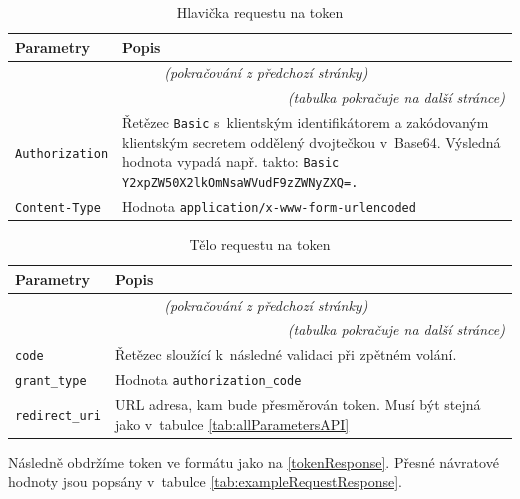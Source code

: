 \documentclass[czech, bc, kiv, he, iso690numb]{fasthesis}
\begin{document}
	\begin{longtable}{p{}p{}}
	\caption{Hlavička requestu na token \cite{emplifiDocs}}
	\label{tab:exampleRequestHeader}\\
	\toprule[1.5pt]
	\textbf{Parametry} & \textbf{Popis}\\
	\midrule
	\endfirsthead
	\multicolumn{2}{c}{\tablename{}~\thetable{} \textit{(pokračování z předchozí stránky)}}\\
	\endhead
	\midrule
	\multicolumn{2}{r}{\textit{(tabulka pokračuje na další stránce)}}\\
	\endfoot
	\bottomrule[1.5pt]
	\endlastfoot
	\verb"Authorization" & Řetězec \texttt{Basic} s~klientským identifikátorem a zakódovaným klientským secretem oddělený dvojtečkou v~Base64. Výsledná hodnota vypadá např. takto: \texttt{Basic Y2xpZW50X2lkOmNsaWVudF9zZWNyZXQ=.}\\
	\midrule
	\verb"Content-Type" & Hodnota \texttt{application/x-www-form-urlencoded} \\
	\end{longtable}

	\begin{longtable}{p{}p{}}
	\caption{Tělo requestu na token \cite{emplifiDocs}}
	\label{tab:exampleRequestBody}\\
	\toprule[1.5pt]
	\textbf{Parametry} & \textbf{Popis}\\
	\midrule
	\endfirsthead
	\multicolumn{2}{c}{\tablename{}~\thetable{} \textit{(pokračování z předchozí stránky)}}\\
	\endhead
	\midrule
	\multicolumn{2}{r}{\textit{(tabulka pokračuje na další stránce)}}\\
	\endfoot
	\bottomrule[1.5pt]
	\endlastfoot
	\verb"code" & Řetězec sloužící k~následné validaci při zpětném volání. \\
	\midrule
	\verb"grant_type" & Hodnota \texttt{authorization\_code} \\
	\midrule
	\verb"redirect_uri" & URL adresa, kam bude přesměrován token. Musí být stejná jako v~tabulce \ref{tab:allParametersAPI} \\
	\end{longtable}

Následně obdržíme token ve formátu jako na \ref{tokenResponse}. Přesné návratové hodnoty jsou popsány v~tabulce \ref{tab:exampleRequestResponse}.
\end{document}
